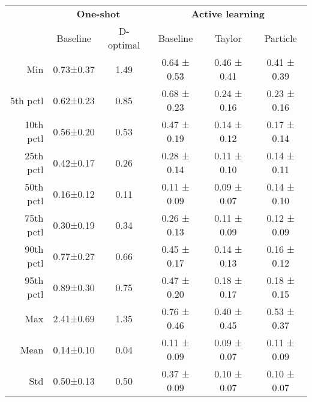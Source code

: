 \begin{tabular}{r|c|c|c|c|c}
\toprule
 & \multicolumn{2}{c}{\textbf{One-shot}} & \multicolumn{3}{c}{\textbf{Active learning}} \\
 & Baseline & D-optimal & Baseline & Taylor & Particle \\
 \midrule
 Min        & 0.73±0.37   &  1.49     & 0.64 ± 0.53  &    0.46 ± 0.41  &   0.41 ± 0.39 \\
 5th pctl   & 0.62±0.23   &  0.85     & 0.68 ± 0.23  &    0.24 ± 0.16  &   0.23 ± 0.16 \\
 10th pctl  & 0.56±0.20   &  0.53     & 0.47 ± 0.19  &    0.14 ± 0.12  &   0.17 ± 0.14 \\
 25th pctl  & 0.42±0.17   &  0.26     & 0.28 ± 0.14  &    0.11 ± 0.10  &   0.14 ± 0.11 \\
 50th pctl  & 0.16±0.12   &  0.11     & 0.11 ± 0.09  &    0.09 ± 0.07  &   0.14 ± 0.10 \\
 75th pctl  & 0.30±0.19   &  0.34     & 0.26 ± 0.13  &    0.11 ± 0.09  &   0.12 ± 0.09 \\
 90th pctl  & 0.77±0.27   &  0.66     & 0.45 ± 0.17  &    0.14 ± 0.13  &   0.16 ± 0.12 \\
 95th pctl  & 0.89±0.30   &  0.75     & 0.47 ± 0.20  &    0.18 ± 0.17  &   0.18 ± 0.15 \\
 Max        & 2.41±0.69   &  1.35     & 0.76 ± 0.46  &    0.40 ± 0.45  &   0.53 ± 0.37 \\
 \midrule
 Mean       & 0.14±0.10   &  0.04     & 0.11 ± 0.09  &    0.09 ± 0.07  &   0.11 ± 0.09 \\
 Std        & 0.50±0.13   &  0.50     & 0.37 ± 0.09  &    0.10 ± 0.07  &   0.10 ± 0.07 \\
\bottomrule
\end{tabular}